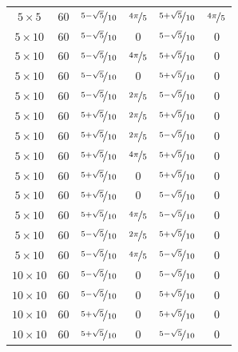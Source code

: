 \documentclass{article}
\begin{document}
\begin{longtable}{cccccc}
$5 \times 5$ & 60 & $\nicefrac{5-\sqrt{5}}{10}$ & $\nicefrac{4\pi}{5}$ & $\nicefrac{5+\sqrt{5}}{10}$ & $\nicefrac{4\pi}{5}$ \\
$5 \times 10$ & 60 & $\nicefrac{5-\sqrt{5}}{10}$ & 0 & $\nicefrac{5-\sqrt{5}}{10}$ & 0 \\
$5 \times 10$ & 60 & $\nicefrac{5-\sqrt{5}}{10}$ & $\nicefrac{4\pi}{5}$ & $\nicefrac{5+\sqrt{5}}{10}$ & 0 \\
$5 \times 10$ & 60 & $\nicefrac{5-\sqrt{5}}{10}$ & 0 & $\nicefrac{5+\sqrt{5}}{10}$ & 0 \\
$5 \times 10$ & 60 & $\nicefrac{5-\sqrt{5}}{10}$ & $\nicefrac{2\pi}{5}$ & $\nicefrac{5-\sqrt{5}}{10}$ & 0 \\
$5 \times 10$ & 60 & $\nicefrac{5+\sqrt{5}}{10}$ & $\nicefrac{2\pi}{5}$ & $\nicefrac{5+\sqrt{5}}{10}$ & 0 \\
$5 \times 10$ & 60 & $\nicefrac{5+\sqrt{5}}{10}$ & $\nicefrac{2\pi}{5}$ & $\nicefrac{5-\sqrt{5}}{10}$ & 0 \\
$5 \times 10$ & 60 & $\nicefrac{5+\sqrt{5}}{10}$ & $\nicefrac{4\pi}{5}$ & $\nicefrac{5+\sqrt{5}}{10}$ & 0 \\
$5 \times 10$ & 60 & $\nicefrac{5+\sqrt{5}}{10}$ & 0 & $\nicefrac{5+\sqrt{5}}{10}$ & 0 \\
$5 \times 10$ & 60 & $\nicefrac{5+\sqrt{5}}{10}$ & 0 & $\nicefrac{5-\sqrt{5}}{10}$ & 0 \\
$5 \times 10$ & 60 & $\nicefrac{5+\sqrt{5}}{10}$ & $\nicefrac{4\pi}{5}$ & $\nicefrac{5-\sqrt{5}}{10}$ & 0 \\
$5 \times 10$ & 60 & $\nicefrac{5-\sqrt{5}}{10}$ & $\nicefrac{2\pi}{5}$ & $\nicefrac{5+\sqrt{5}}{10}$ & 0 \\
$5 \times 10$ & 60 & $\nicefrac{5-\sqrt{5}}{10}$ & $\nicefrac{4\pi}{5}$ & $\nicefrac{5-\sqrt{5}}{10}$ & 0 \\
$10 \times 10$ & 60 & $\nicefrac{5-\sqrt{5}}{10}$ & 0 & $\nicefrac{5-\sqrt{5}}{10}$ & 0 \\
$10 \times 10$ & 60 & $\nicefrac{5-\sqrt{5}}{10}$ & 0 & $\nicefrac{5+\sqrt{5}}{10}$ & 0 \\
$10 \times 10$ & 60 & $\nicefrac{5+\sqrt{5}}{10}$ & 0 & $\nicefrac{5+\sqrt{5}}{10}$ & 0 \\
$10 \times 10$ & 60 & $\nicefrac{5+\sqrt{5}}{10}$ & 0 & $\nicefrac{5-\sqrt{5}}{10}$ & 0 \\

\end{longtable}
\end{document}
